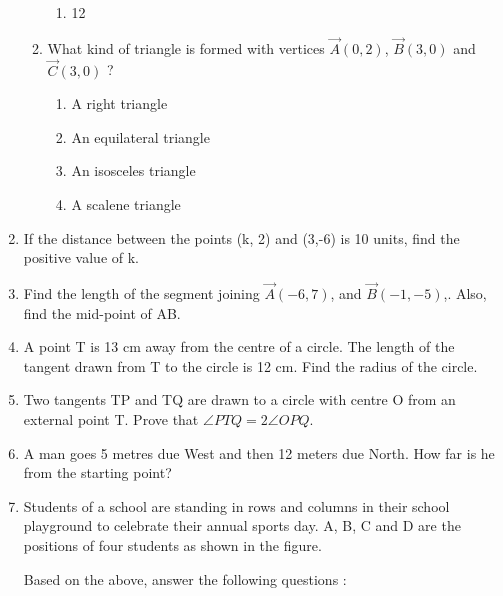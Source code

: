 \documentclass{article}
\begin{document}
\begin{enumerate}
\begin{enumerate}
\begin{enumerate}
				\item 12
			\end{enumerate}
			\item  What kind of triangle is formed with vertices $\vec{A}(0, 2)$, $\vec{B}(3, 0)$ and $\vec{C}(3, 0)$ ? 
			\begin{enumerate}
				\item A right triangle 
				\item An equilateral triangle
				\item An isosceles triangle 
				\item A scalene triangle 
			\end{enumerate}
		\end{enumerate}
		
        \item  If the distance between the points (k, 2) and (3,-6) is 10 units, find the positive value of k. 
			
        \item  Find the length of the segment joining $\vec{A}(-6, 7)$, and $\vec{B}(-1, -5)$,. Also, find the mid-point of AB. 
	
		\item  A point T is 13 cm away from the centre of a circle. The length of the tangent drawn from T to the circle is 12 cm. Find the radius of the circle. 
	
		\item  Two tangents TP and TQ are drawn to a circle with centre O from an external point T. Prove that $\angle PTQ= 2 \angle OPQ$. 

		\item  A man goes 5 metres due West and then 12 meters due North. How far is he from the starting point?

		\item Students of a school are standing in rows and columns in their school playground to celebrate their annual sports day. A, B, C and D are the positions of four students as shown in the figure.
		\begin{center}
		\end{center}
		Based on the above, answer the following questions : 
		

\end{enumerate}
\end{document}
